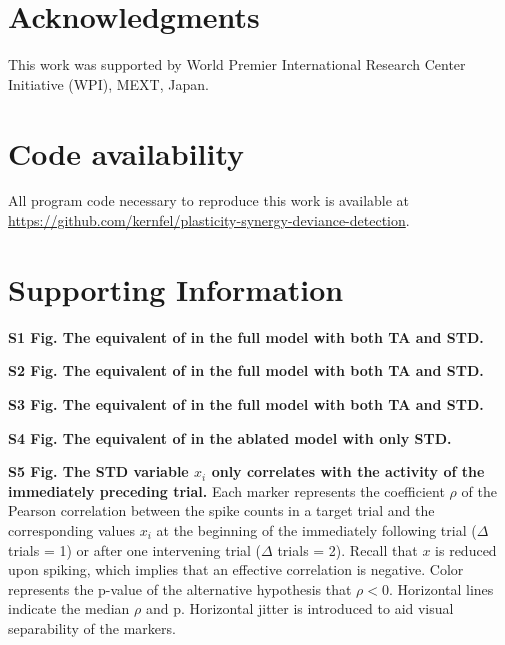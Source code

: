 \documentclass[9pt,lineno,onehalfspacing]{elife}
\begin{document}
\section{Acknowledgments}

This work was supported by World Premier International Research Center Initiative (WPI), MEXT, Japan.

\section{Code availability}

All program code necessary to reproduce this work is available at \\
\url{https://github.com/kernfel/plasticity-synergy-deviance-detection}.



\section{Supporting Information}

\textbf{S1 Fig. The equivalent of  in the full model with both TA and STD.}

\textbf{S2 Fig. The equivalent of  in the full model with both TA and STD.}

\textbf{S3 Fig. The equivalent of  in the full model with both TA and STD.}

\textbf{S4 Fig. The equivalent of  in the ablated model with only STD.}

\textbf{S5 Fig. The STD variable $x_i$ only correlates with the activity of the immediately preceding trial.}
Each marker represents the coefficient $\rho$ of the Pearson correlation between the spike counts in a target trial and the corresponding values $x_i$ at the beginning of the immediately following trial ($\Delta$ trials = 1) or after one intervening trial ($\Delta$ trials = 2). Recall that $x$ is reduced upon spiking, which implies that an effective correlation is negative. Color represents the p-value of the alternative hypothesis that $\rho < 0$. Horizontal lines indicate the median $\rho$ and p. Horizontal jitter is introduced to aid visual separability of the markers.
\end{document}
